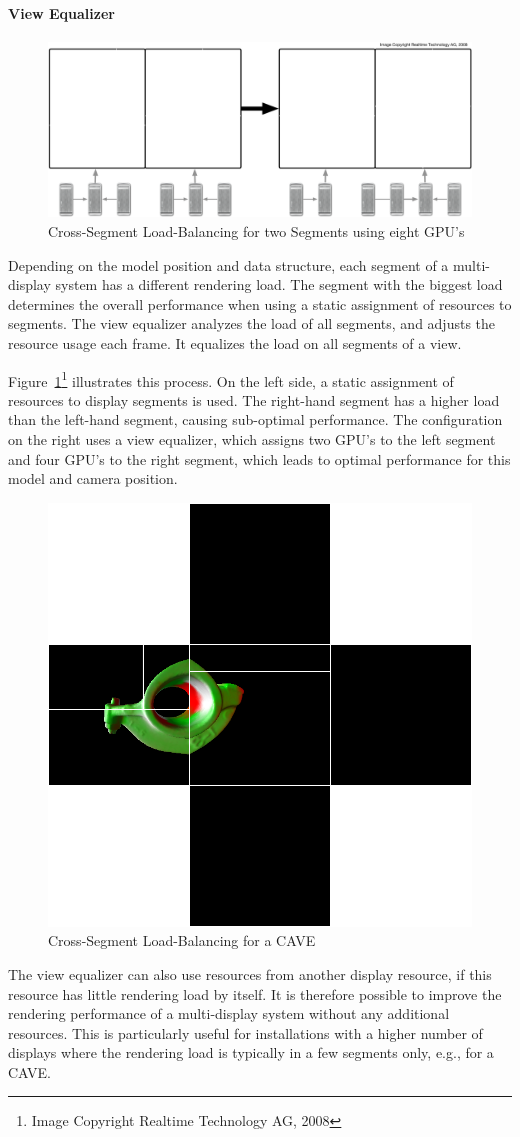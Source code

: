 \documentclass[10pt,a4]{scrartcl}
\newcommand{\fig}[1]{Figure~\ref{#1}}
\begin{document}
\paragraph{View Equalizer}

\begin{figure}
  \includegraphics[width=.618\textwidth]{images/viewLB.pdf}
  {\caption{\label{fViewLoadBalancing}\small Cross-Segment
      Load-Balancing for two Segments using eight GPU's}}
\end{figure}
Depending on the model position and data structure, each segment of a
multi-display system has a different rendering load. The segment with
the biggest load determines the overall performance when using a static
assignment of resources to segments. The view equalizer analyzes the
load of all segments, and adjusts the resource usage each frame. It
equalizes the load on all segments of a view.

\fig{fViewLoadBalancing}\footnote{Image Copyright Realtime Technology
  AG, 2008} illustrates this process. On the left side, a static
assignment of resources to display segments is used. The right-hand
segment has a higher load than the left-hand segment, causing
sub-optimal performance. The configuration on the right uses a view
equalizer, which assigns two GPU's to the left segment and four GPU's to
the right segment, which leads to optimal performance for this model and
camera position.

\begin{figure} 
    \includegraphics[width=.382\textwidth]{images/viewLB.png}
    {\caption{\label{fViewLoadBalancing2}\small Cross-Segment
        Load-Balancing for a CAVE}}
\end{figure}
The view equalizer can also use resources from another display resource,
if this resource has little rendering load by itself. It is therefore
possible to improve the rendering performance of a multi-display system
without any additional resources. This is particularly useful for
installations with a higher number of displays where the rendering load
is typically in a few segments only, e.g., for a CAVE.
\end{document}
